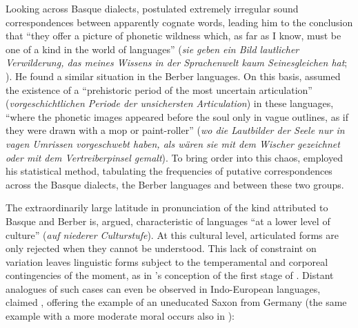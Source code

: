 \documentclass[output=paper]{langscibook}
\begin{document}
Looking across Basque dialects, \citet{Gabelentz1893} postulated extremely irregular sound correspondences between apparently cognate words, leading him to the conclusion that ``they offer a picture of phonetic wildness which, as far as I know, must be one of a kind in the world of languages'' (\emph{sie geben ein Bild lautlicher Verwilderung, das meines Wissens in der Sprachenwelt kaum Seinesgleichen hat}; \citealt[596]{Gabelentz1893}). He found a similar situation in the Berber languages. On this basis, \citet[604]{Gabelentz1893} assumed the existence of a ``prehistoric period of the most uncertain articulation'' (\emph{vorgeschichtlichen Periode der unsichersten Articulation}) in these languages, ``where the phonetic images appeared before the soul only in vague outlines, as if they were drawn with a mop or paint-roller'' (\emph{wo die Lautbilder der Seele nur in vagen Umrissen vorgeschwebt haben, als wären sie mit dem Wischer gezeichnet oder mit dem Vertreiberpinsel gemalt}). To bring order into this chaos, {\Gabelentz} employed his statistical method, tabulating the frequencies of putative correspondences across the Basque dialects, the Berber languages and between these two groups.

The extraordinarily large latitude in pronunciation of the kind attributed to Basque and Berber is, \citet[606]{Gabelentz1893} argued, characteristic of languages ``at a lower level of culture'' (\emph{auf niederer Culturstufe}). At this cultural level, articulated forms are only rejected when they cannot be understood. This lack of constraint on variation leaves linguistic forms subject to the temperamental and corporeal contingencies of the moment, as in {\Steinthal}'s conception of the first stage of . Distant analogues of such cases can even be observed in Indo-European languages, claimed {\Gabelentz}, offering the example of an uneducated Saxon from Germany (the same example with a more moderate moral occurs also in \citealt[398]{Gabelentz20161891}):
\end{document}
